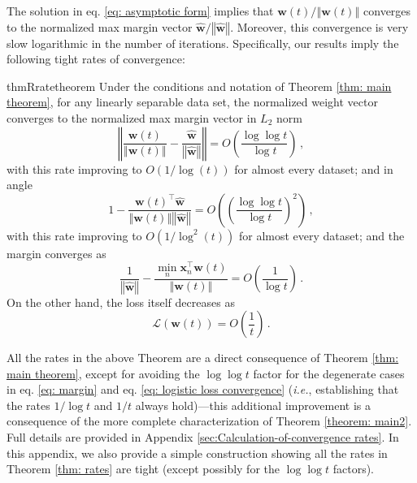 \documentclass[twoside,11pt,english]{article}
\begin{document}
The solution in eq. \ref{eq: asymptotic form} implies that $\mathbf{w}\left(t\right)/\left\Vert \mathbf{w}\left(t\right)\right\Vert $
converges to the normalized max margin vector $\hat{\mathbf{w}}/\left\Vert \hat{\mathbf{w}}\right\Vert .$
Moreover, this convergence is very slow\textemdash{} logarithmic in
the number of iterations. Specifically, our results imply the following
tight rates of convergence:
\begin{restatable}{thmR}{ratetheorem}%
\label{thm: rates} Under the conditions and notation of Theorem \ref{thm: main theorem}, for any linearly separable data set, the normalized weight vector converges to the normalized max margin vector
in $L_{2}$ norm 
\begin{equation}
\left\Vert \frac{\mathbf{w}\left(t\right)}{\left\Vert \mathbf{w}\left(t\right)\right\Vert }-\frac{\hat{\mathbf{w}}}{\left\Vert \hat{\mathbf{w}}\right\Vert }\right\Vert =O\left(\frac{\log\log t}{\log t}\right)\,,\label{eq: normalized weight vector}
\end{equation}
with this rate improving to $O(1/\log(t))$ for almost every dataset; and in angle 
\begin{equation}
1-\frac{\mathbf{w}\left(t\right)^{\top}\hat{\mathbf{w}}}{\left\Vert \mathbf{w}\left(t\right)\right\Vert \left\Vert \hat{\mathbf{w}}\right\Vert }=O\left(\left(\frac{\log\log t}{\log t}\right)^2\right)\,,\label{eq: angle}
\end{equation}
with this rate improving to $O(1/\log^2(t))$ for almost every dataset;
and the margin converges as 
\begin{equation}
\frac{1}{\left\Vert \hat{\mathbf{w}}\right\Vert }-\frac{\min_{n}\mathbf{x}_{n}^{\top}\mathbf{w}\left(t\right)}{\left\Vert \mathbf{w}\left(t\right)\right\Vert }=O\left(\frac{1}{\log t}\right)\,.\label{eq: margin}
\end{equation}
On the other hand, the loss itself decreases as
\begin{equation}
\mathcal{L}\left(\mathbf{w}\left(t\right)\right)=O\left({\frac{1}{t}}\right)\,.\label{eq: logistic loss convergence}
\end{equation}
\end{restatable}
All the rates in the above Theorem are a direct consequence of Theorem \ref{thm: main theorem}, except for avoiding the $\log \log t$ factor for the degenerate cases in eq. \ref{eq: margin} and eq. \ref{eq: logistic loss convergence} (\emph{i.e.}, establishing that the rates  $1/\log t$ and $1/t$ always hold)---this additional improvement is a consequence of the more complete characterization of Theorem \ref{theorem: main2}.  Full details are provided in Appendix \ref{sec:Calculation-of-convergence rates}.  In this appendix, we also provide a simple construction showing all the rates in Theorem \ref{thm: rates} are tight (except possibly for the $\log\log t$ factors).  
\end{document}
